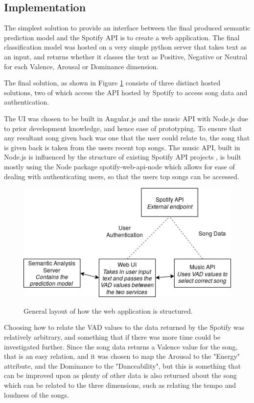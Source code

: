 \subsection{Implementation}

The simplest solution to provide an interface between the final produced semantic prediction model and the Spotify API is to create a web application. The final classification model was hosted on a very simple python server that takes text as an input, and returns whether it classes the text as Positive, Negative or Neutral for each Valence, Arousal or Dominance dimension. 

The final solution, as shown in Figure \ref{implementationLayout} consists of three distinct hosted solutions, two of which access the API hosted by Spotify to access song data and authentication.

The UI was chosen to be built in Angular.js and the music API with Node.js due to prior development knowledge, and hence ease of prototyping. 
To ensure that any resultant song given back was one that the user could relate to, the song that is given back is taken from the users recent top songs. 
The music API, built in Node.js is influenced by the structure of existing Spotify API projects \cite{moodtape}, is built mostly using the Node package spotify-web-api-node \cite{nodeSpotify} which allows for ease of dealing with authenticating users, so that the users top songs can be accessed.

\begin{figure}[ht]
\caption{General layout of how the web application is structured.}
\centering
\includegraphics[scale=0.6]{litImgs/interfaceLayout.png}
\label{implementationLayout}
\end{figure}

Choosing how to relate the VAD values to the data returned by the Spotify was relatively arbitrary, and something that if there was more time could be investigated further. Since the song data returns a Valence value for the song, that is an easy relation, and it was chosen to map the Arousal to the "Energy" attribute, and the Dominance to the "Danceability", but this is something that can be improved upon as plenty of other data is also returned about the song which can be related to the three dimensions, such as relating the tempo and loudness of the songs.

